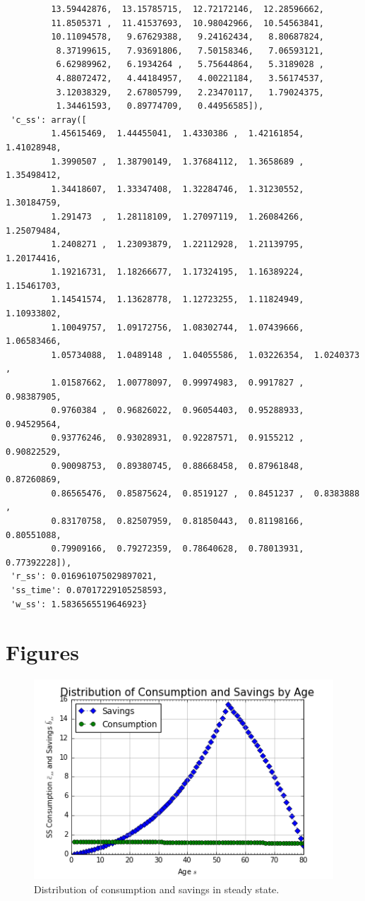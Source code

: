 \documentclass[letterpaper,12pt]{article}
\theoremstyle{definition}
\begin{document}
\begin{enumerate}
\begin{enumerate}[(a)]
\begin{verbatim}
         13.59442876,  13.15785715,  12.72172146,  12.28596662,
         11.8505371 ,  11.41537693,  10.98042966,  10.54563841,
         10.11094578,   9.67629388,   9.24162434,   8.80687824,
          8.37199615,   7.93691806,   7.50158346,   7.06593121,
          6.62989962,   6.1934264 ,   5.75644864,   5.3189028 ,
          4.88072472,   4.44184957,   4.00221184,   3.56174537,
          3.12038329,   2.67805799,   2.23470117,   1.79024375,
          1.34461593,   0.89774709,   0.44956585]),
 'c_ss': array([ 
         1.45615469,  1.44455041,  1.4330386 ,  1.42161854,  1.41028948,
         1.3990507 ,  1.38790149,  1.37684112,  1.3658689 ,  1.35498412,
         1.34418607,  1.33347408,  1.32284746,  1.31230552,  1.30184759,
         1.291473  ,  1.28118109,  1.27097119,  1.26084266,  1.25079484,
         1.2408271 ,  1.23093879,  1.22112928,  1.21139795,  1.20174416,
         1.19216731,  1.18266677,  1.17324195,  1.16389224,  1.15461703,
         1.14541574,  1.13628778,  1.12723255,  1.11824949,  1.10933802,
         1.10049757,  1.09172756,  1.08302744,  1.07439666,  1.06583466,
         1.05734088,  1.0489148 ,  1.04055586,  1.03226354,  1.0240373 ,
         1.01587662,  1.00778097,  0.99974983,  0.9917827 ,  0.98387905,
         0.9760384 ,  0.96826022,  0.96054403,  0.95288933,  0.94529564,
         0.93776246,  0.93028931,  0.92287571,  0.9155212 ,  0.90822529,
         0.90098753,  0.89380745,  0.88668458,  0.87961848,  0.87260869,
         0.86565476,  0.85875624,  0.8519127 ,  0.8451237 ,  0.8383888 ,
         0.83170758,  0.82507959,  0.81850443,  0.81198166,  0.80551088,
         0.79909166,  0.79272359,  0.78640628,  0.78013931,  0.77392228]),
 'r_ss': 0.016961075029897021,
 'ss_time': 0.07017229105258593,
 'w_ss': 1.5836565519646923}
\end{verbatim}

	\end{enumerate}
	
\end{enumerate}
\clearpage

\section*{Figures}

\begin{figure}[h!]
	\centering
	\includegraphics[scale=.8]{code/images/cons_savings_dist}
	\caption{Distribution of consumption and savings in steady state.}
	\end{figure}
	
\end{document}
